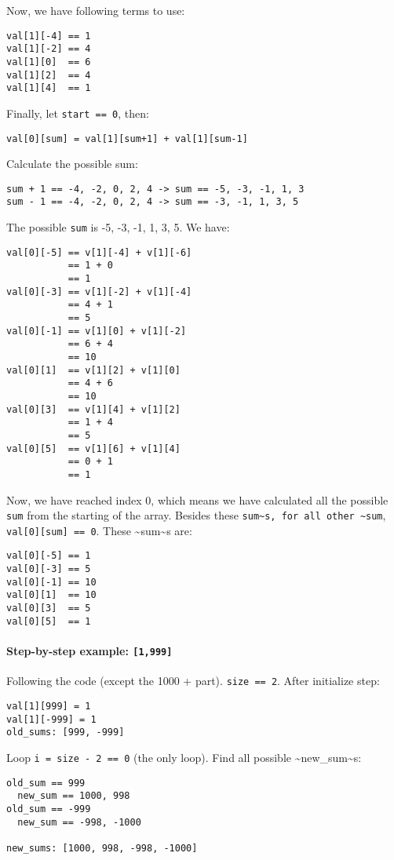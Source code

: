 \documentclass[11pt]{article}
\begin{document}
Now, we have following terms to use:
\begin{Verbatim}[frame=single]
val[1][-4] == 1
val[1][-2] == 4
val[1][0]  == 6
val[1][2]  == 4
val[1][4]  == 1
\end{Verbatim}
Finally, let \texttt{start == 0}, then:
\begin{Verbatim}[frame=single]
val[0][sum] = val[1][sum+1] + val[1][sum-1]
\end{Verbatim}
Calculate the possible sum:
\begin{Verbatim}[frame=single]
sum + 1 == -4, -2, 0, 2, 4 -> sum == -5, -3, -1, 1, 3
sum - 1 == -4, -2, 0, 2, 4 -> sum == -3, -1, 1, 3, 5
\end{Verbatim}
The possible \texttt{sum} is -5, -3, -1, 1, 3, 5. We have:
\begin{Verbatim}[frame=single]
val[0][-5] == v[1][-4] + v[1][-6]
           == 1 + 0
           == 1
val[0][-3] == v[1][-2] + v[1][-4]
           == 4 + 1
           == 5
val[0][-1] == v[1][0] + v[1][-2]
           == 6 + 4
           == 10
val[0][1]  == v[1][2] + v[1][0]
           == 4 + 6
           == 10
val[0][3]  == v[1][4] + v[1][2]
           == 1 + 4
           == 5
val[0][5]  == v[1][6] + v[1][4]
           == 0 + 1
           == 1
\end{Verbatim}
Now, we have reached index 0, which means we have calculated all the possible \texttt{sum} from the starting of the array. Besides these \texttt{sum\textasciitilde{}s, for all other \textasciitilde{}sum}, \texttt{val[0][sum] == 0}. These \textasciitilde{}sum\textasciitilde{}s are:
\begin{Verbatim}[frame=single]
val[0][-5] == 1
val[0][-3] == 5
val[0][-1] == 10
val[0][1]  == 10
val[0][3]  == 5
val[0][5]  == 1
\end{Verbatim}
\paragraph{Step-by-step example: \texttt{[1,999]}}
\label{sec:org02c15da}

Following the code (except the 1000 + part). \texttt{size == 2}. After initialize step:
\begin{Verbatim}[frame=single]
val[1][999] = 1
val[1][-999] = 1
old_sums: [999, -999]
\end{Verbatim}
Loop \texttt{i = size - 2 == 0} (the only loop). Find all possible \textasciitilde{}new\_sum\textasciitilde{}s:
\begin{Verbatim}[frame=single]
old_sum == 999
  new_sum == 1000, 998
old_sum == -999
  new_sum == -998, -1000

new_sums: [1000, 998, -998, -1000]
\end{Verbatim}
\end{document}
